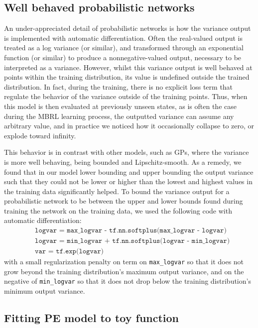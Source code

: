 
\FloatBarrier
\subsection{Well behaved probabilistic networks}
\label{sec:variance-bounding}
\FloatBarrier

An under-appreciated detail of probabilistic networks is how the variance output is implemented with automatic differentiation. 
Often the real-valued output is treated as a log variance (or similar), and transformed through an exponential function (or similar) to produce a nonnegative-valued output, necessary to be interpreted as a variance. 
However, whilst this variance output is well behaved at points within the training distribution, its value is undefined outside the trained distribution. 
In fact, during the training, there is no explicit loss term that regulate the behavior of the variance outside of the training points.
Thus, when this model is then evaluated at previously unseen states, as is often the case during the MBRL learning process, the outputted variance can assume any arbitrary value, and in practice we noticed how it occasionally collapse to zero, or explode toward infinity. 

This behavior is in contrast with other models, such as GPs, where the variance is more well behaving, being bounded and Lipschitz-smooth.
As a remedy, we found that in our model lower bounding and upper bounding the output variance such that they could not be lower or higher than the lowest and highest values in the training data significantly helped. 
%
To bound the variance output for a probabilistic network to be between the upper and lower bounds found during training the network on the training data, we used the following code 
with automatic differentiation:
%
\begin{align*} 
&\texttt{logvar = max\_logvar - tf.nn.softplus(max\_logvar - logvar)} \\
&\texttt{logvar = min\_logvar + tf.nn.softplus(logvar - min\_logvar)} \\
&\texttt{var = tf.exp(logvar)}
\end{align*}
%
with a small regularization penalty on term on \texttt{max\_logvar} so that it does not grow beyond the training distribution's maximum output variance, and on the negative of \texttt{min\_logvar} so that it does not drop below the training distribution's minimum output variance.

\subsection{Fitting PE model to toy function}
\label{app:pe-model-toy}
\FloatBarrier

